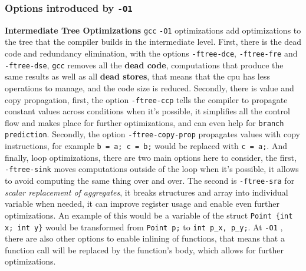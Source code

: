 \documentclass{rapport}
\newcommand{\gcc}{\texttt{gcc} }
\newcommand{\optione}{\texttt{-O1} }
\begin{document}
\subsubsection{Options introduced by \optione}
\textbf{Intermediate Tree Optimizations} \newline
\gcc \optione optimizations add optimizations to the tree that the compiler builds in the intermediate level.
\newline
First, there is the dead code and redundancy elimination, with the options \texttt{-ftree-dce}, \texttt{-ftree-fre} and \texttt{-ftree-dse}, \gcc removes all the \textbf{dead code}, 
computations that produce the same results as well as all \textbf{dead stores}, that means that the cpu has less operations to manage, and the code size is reduced.
\newline
Secondly, there is value and copy propagation, first, the option \texttt{-ftree-ccp} tells the compiler to propagate constant values across conditions when it's possible, 
it simplifies all the control flow and makes place for further optimizations, and can even help for \texttt{branch prediction}. \newline Secondly, the option \texttt{-ftree-copy-prop} 
propagates values with copy instructions, for example \texttt{b = a; c = b;} would be replaced with \texttt{c = a;}.
\newline
And finally, loop optimizations, there are two main options here to consider, the first, \texttt{-ftree-sink} moves computations outside of the loop when it's possible, it allows to 
avoid computing the same thing over and over. \newline
The second is \texttt{-ftree-sra} for \textit{scalar replacement of aggregates}, it breaks structures and array into individual variable when needed, it can improve register usage and 
enable even further optimizations. An example of this would be a variable of the struct \texttt{Point \{int x; int y\}} would be transformed from \texttt{Point p;} to 
\texttt{int p\_x, p\_y;}.
\newline\newline
At \optione, there are also other options to enable inlining of functions, that means that a function call will be replaced by the function's body, which allows for further optimizations.
\end{document}
